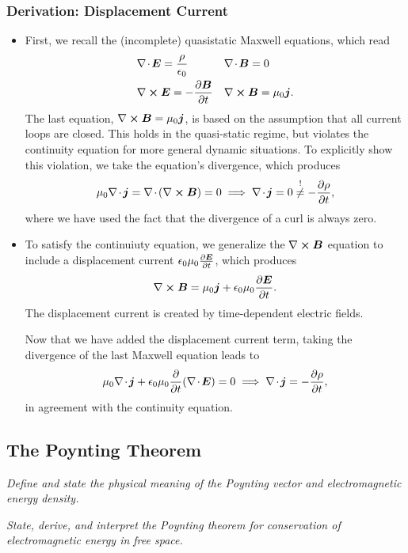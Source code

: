 \documentclass[11pt, a4paper]{article}
\renewcommand{\vec}[1]{\bm{#1}} %
\newcommand{\E}{\vec{E}} %
\newcommand{\B}{\vec{B}} %
\newcommand{\ee}{\epsilon_{0}}  %
\newcommand{\mm}{\mu_{0}}  %
\renewcommand{\j}{\vec{j}}  %
\renewcommand{\div}{\nabla \mspace{-2mu} \cdot \mspace{-2mu}}
\renewcommand{\curl}{\nabla \cross}
\begin{document}
\subsubsection{Derivation: Displacement Current}
\begin{itemize}
	\item First, we recall the (incomplete) quasistatic Maxwell equations, which read 
	\begin{align*}
		&\div \E = \frac{\rho}{\ee} && \div \B = 0\\
		& \curl \E = - \pdv{\B}{t} && \curl \B = \mm \j.
	\end{align*}
	The last equation, $ \curl \B = \mm \j $, is based on the assumption that all current loops are closed. This holds in the quasi-static regime, but violates the continuity equation for more general dynamic situations. To explicitly show this violation, we take the equation's divergence, which produces
	\begin{equation*}
        \mm \div \j = \div (\curl \B) = 0 \implies \div \j = 0 \stackrel{!}{\neq} - \pdv{\rho}{t},
	\end{equation*}
    where we have used the fact that the divergence of a curl is always zero.

    \item To satisfy the continuiuty equation, we generalize the $ \curl \B $ equation to include a displacement current $ \ee \mm \pdv{\E}{t} $, which produces
	\begin{equation*}
		\curl \B = \mm \j + \ee \mm \pdv{\E}{t}.
	\end{equation*}
	The displacement current is created by time-dependent electric fields. 

    Now that we have added the displacement current term, taking the divergence of the last Maxwell equation leads to
	\begin{equation*}
		\mm \div \j + \ee \mm \pdv{t}(\div \E) = 0 \implies \div \j = - \pdv{\rho}{t},
	\end{equation*}
    in agreement with the continuity equation.
	
\end{itemize}

\subsection{The Poynting Theorem}
\textit{Define and state the physical meaning of the Poynting vector and electromagnetic energy density.}

\vspace{2mm}
\textit{State, derive, and interpret the Poynting theorem for conservation of electromagnetic energy in free space.}
\end{document}
